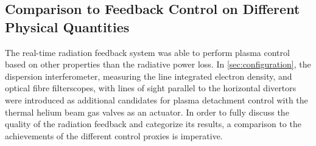         \subsection{Comparison to Feedback Control on Different Physical Quantities}\label{subsec:densityfeedback}%
%
            The real-time radiation feedback system was able to perform plasma control based on other properties than the radiative power loss. In \cref{sec:configuration}, the dispersion interferometer, measuring the line integrated electron density, and optical fibre filterscopes, with lines of sight parallel to the horizontal divertors were introduced as additional candidates for plasma detachment control with the thermal helium beam gas valves as an actuator. In order to fully discuss the quality of the radiation feedback and categorize its results, a comparison to the achievements of the different control proxies is imperative.%
%
